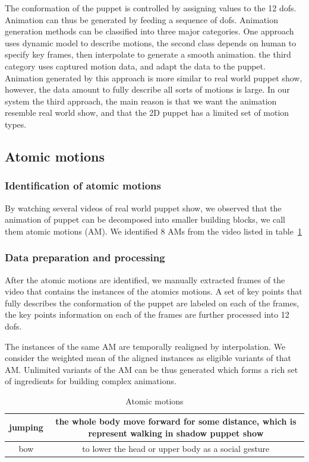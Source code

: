 \documentclass[letter]{sig-alternate}
\begin{document}
The conformation of the puppet is controlled by assigning values to the 12 dofs. Animation can thus be generated by feeding a sequence of dofs. Animation generation methods can be classified into three major categories. One approach uses dynamic model to describe motions, the second class depends on human to specify key frames, then interpolate to generate a smooth animation. the third category uses captured motion data, and adapt the data to the puppet. Animation generated by this approach is more similar to real world puppet show, however, the data amount to fully describe all sorts of motions is large. In our system the third approach, the main reason is that we want the animation resemble real world show, and that the 2D puppet has a limited set of motion types.

\subsection{Atomic motions}
\subsubsection{Identification of atomic motions}
By watching several videos of real world puppet show, we observed that the animation of puppet can be decomposed into smaller building blocks, we call them atomic motions (AM). We identified 8 AMs from the video listed in table~\ref{table:atomicmotions}


\subsubsection{Data preparation and processing}
After the atomic motions are identified, we manually extracted frames of the video that contains the instances of the atomics motions. A set of key points that fully describes the conformation of the puppet are labeled on each of the frames, the key points information on each of the frames are further processed into 12 dofs.

The instances of the same AM are temporally realigned by interpolation. We consider the weighted mean of the aligned instances as eligible variants of that AM. Unlimited variants of the AM can be thus generated which forms a rich set of ingredients for building complex animations.


\begin{table} [h]\centering
\small
\setlength{\tabcolsep}{0.1cm}
\caption{Atomic motions} \label{table:atomicmotions}
\begin{tabular}{|c|c|}
  \hline
jumping & the whole body move forward for some distance, which is represent walking in shadow puppet show \\
\hline
bow & to lower the head or upper body as a social gesture \\
  \hline
\end{tabular}
\vspace{-4mm}
\end{table}
\end{document}
